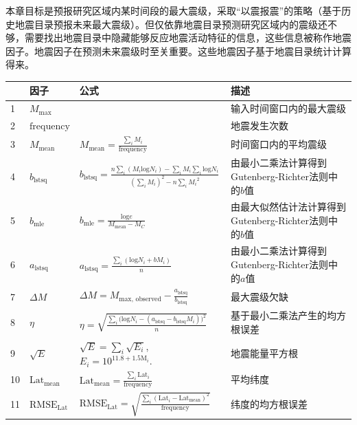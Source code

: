本章目标是预报研究区域内某时间段的最大震级，采取“以震报震”的策略（基于历史地震目录预报未来最大震级）。但仅依靠地震目录预测研究区域内的震级还不够，需要找出地震目录中隐藏能够反应地震活动特征的信息，这些信息被称作地震因子。地震因子在预测未来震级时至关重要。这些地震因子基于地震目录统计计算得来。

\begin{table}
  \centering
  \label{tab:seism_input_data}
  \footnotesize
  \begin{tabular}{llll}
    \toprule
      & 因子 & 公式 & 描述 \\
    \midrule
    1 & $M_{\text{max}}$ &  & 输入时间窗口内的最大震级 \\ 
    2 & $\text{frequency}$ &  & 地震发生次数 \\ 
    3 & $M_{\text{mean}}$ & $\displaystyle M_{\text{mean}}=\frac{\sum_i{M_i}}{\text{frequency}}$ & 时间窗口内的平均震级 \\ 
    4 & $b_{\text{lstsq}}$ & $\displaystyle b_{\text{lstsq}}=\frac{n\sum_i{(M_i\text{log} N_i)}-\sum_i{M_i}\sum_i\text{log}N_i}{(\sum_i{M_i})^2-n\sum_i{{M_i}^2}}$ & 由最小二乘法计算得到Gutenberg-Richter法则中的$b$值\\
    5 & $b_{\text{mle}}$ & $\displaystyle b_{\text{mle}}=\frac{\text{log}e}{M_{\text{mean}}-M_C}$ & 由最大似然估计法计算得到Gutenberg-Richter法则中的$b$值 \\ 
    6 & $a_{\text{lstsq}}$ & $\displaystyle a_{\text{lstsq}}=\frac{\sum_i{(\text{log}N_i+bM_i)}}{n}$ & 由最小二乘法计算得到Gutenberg-Richter法则中的$a$值 \\ 
    7 & $\Delta M$ & $\displaystyle \Delta M=M_{\text{max, observed}}- \frac{a_{\text{lstsq}}}{b_{\text{lstsq}}}$ & 最大震级欠缺 \\ 
    8 & $\eta$ & $\displaystyle \eta=\sqrt{\frac{\sum_i{(\text{log} {N_i}}-(a_{\text{lstsq}}-b_{\text{lstsq}}{M_i}))^2}{n}}$ & 基于最小二乘法产生的均方根误差 \\ 
    9 & $\sqrt{E}$ & $\displaystyle \sqrt{E}=\sum_i{\sqrt{E_i}}$, $\displaystyle E_i=10^{11.8+1.5\text{M}_i}.$ & 地震能量平方根\citep{Last2016predicting,asim2017earthquake}  \\ 
    10 & $\text{Lat}_{\text{mean}}$ & $\displaystyle \text{Lat}_{\text{mean}}=\frac{\sum_i{\text{Lat}_i}}{\text{frequency}}$ & 平均纬度 \\ 
    11 & $\text{RMSE}_{\text{Lat}}$ & $\displaystyle \text{RMSE}_{\text{Lat}}=\sqrt{\frac{\sum_i{(\text{Lat}_i-\text{Lat}_\text{mean})}^2}{\text{frequency}}}$ & 纬度的均方根误差 \\ 

\end{tabular}
\end{table}

